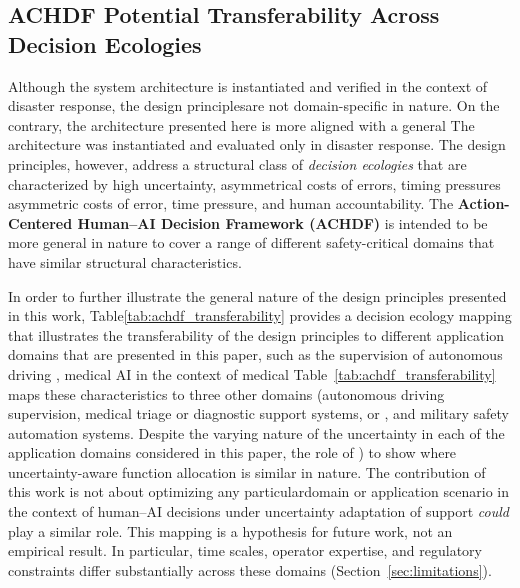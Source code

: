 \documentclass[journal]{IEEEtran}
\theoremstyle{plain}
\theoremstyle{definition}
\providecommand{\DIFaddtex}[1]{{\protect\color{blue} \sf #1}} %
\providecommand{\DIFdeltex}[1]{{\protect\color{red} \scriptsize #1}} %
\providecommand{\DIFaddbegin}{} %
\providecommand{\DIFaddend}{} %
\providecommand{\DIFdelbegin}{} %
\providecommand{\DIFdelend}{} %
\providecommand{\DIFadd}[1]{\texorpdfstring{\DIFaddtex{#1}}{#1}} %
\providecommand{\DIFdel}[1]{\texorpdfstring{\DIFdeltex{#1}}{}} %
\newcommand{\DIFscaledelfig}{0.5}
\newlength{\DIFdelgraphicswidth} %
\newlength{\DIFdelgraphicsheight} %
\newcommand{\DIFaddincludegraphics}[2][]{{\color{blue}\fbox{\DIFOincludegraphics[#1]{#2}}}} %
\newcommand{\DIFdelincludegraphics}[2][]{%
\sbox{\DIFdelgraphicsbox}{\DIFOincludegraphics[#1]{#2}}%
\settoboxwidth{\DIFdelgraphicswidth}{\DIFdelgraphicsbox} %
\settoboxtotalheight{\DIFdelgraphicsheight}{\DIFdelgraphicsbox} %
\scalebox{\DIFscaledelfig}{%
\parbox[b]{\DIFdelgraphicswidth}{\usebox{\DIFdelgraphicsbox}\\[-\baselineskip] \rule{\DIFdelgraphicswidth}{0em}}\llap{\resizebox{\DIFdelgraphicswidth}{\DIFdelgraphicsheight}{%
\setlength{\unitlength}{\DIFdelgraphicswidth}%
\begin{picture}(1,1)%
\thicklines\linethickness{2pt} %
{\color[rgb]{1,0,0}\put(0,0){\framebox(1,1){}}}%
{\color[rgb]{1,0,0}\put(0,0){\line( 1,1){1}}}%
{\color[rgb]{1,0,0}\put(0,1){\line(1,-1){1}}}%
\end{picture}%
}\hspace*{3pt}}} %
} %
\DeclareRobustCommand{\DIFaddbegin}{\DIFOaddbegin \let\includegraphics\DIFaddincludegraphics} %
\DeclareRobustCommand{\DIFaddend}{\DIFOaddend \let\includegraphics\DIFOincludegraphics} %
\DeclareRobustCommand{\DIFdelbegin}{\DIFOdelbegin \let\includegraphics\DIFdelincludegraphics} %
\DeclareRobustCommand{\DIFdelend}{\DIFOaddend \let\includegraphics\DIFOincludegraphics} %
\begin{document}
\subsection{\DIFdelbegin \DIFdel{ACHDF }\DIFdelend \DIFaddbegin \DIFadd{Potential }\DIFaddend Transferability Across Decision Ecologies}
\DIFdelbegin \DIFdel{Although the system architecture is instantiated and verified in the context of disaster response, the design principlesare not domain-specific in nature. On the contrary, the architecture presented here is more aligned with a general }\DIFdelend \DIFaddbegin \DIFadd{The architecture was instantiated and evaluated only in disaster response. The design principles, however, address a structural }\DIFaddend class of \emph{decision ecologies} \DIFdelbegin \DIFdel{that are }\DIFdelend characterized by high uncertainty, \DIFdelbegin \DIFdel{asymmetrical costs of errors, timing pressures}\DIFdelend \DIFaddbegin \DIFadd{asymmetric costs of error, time pressure}\DIFaddend , and human accountability. \DIFdelbegin \DIFdel{The \textbf{Action-Centered Human--AI Decision Framework (ACHDF)} is intended to be more general in nature to cover a range of different safety-critical domains that have similar structural characteristics.
}%

\DIFdel{In order to further illustrate the general nature of the design principles presented in this work, Table\ref{tab:achdf_transferability} provides a decision ecology mapping that illustrates the transferability of the design principles to different application domains that are presented in this paper, such as the supervision of autonomous driving , medical AI in the context of medical }\DIFdelend \DIFaddbegin \DIFadd{Table~\ref{tab:achdf_transferability} maps these characteristics to three other domains (autonomous driving supervision, medical }\DIFaddend triage or diagnostic support\DIFdelbegin \DIFdel{systems, or }\DIFdelend \DIFaddbegin \DIFadd{, and }\DIFaddend military safety automation\DIFdelbegin \DIFdel{systems. Despite the varying nature of the uncertainty in each of the application domains considered in this paper, the role of }\DIFdelend \DIFaddbegin \DIFadd{) to show where }\DIFaddend uncertainty-aware \DIFdelbegin \DIFdel{function allocation is similar in nature. The contribution of this work is not about optimizing any particulardomain or application scenario in the context of human--AI decisions under uncertainty}\DIFdelend \DIFaddbegin \DIFadd{adaptation of support \emph{could} play a similar role. This mapping is a hypothesis for future work, not an empirical result. In particular, time scales, operator expertise, and regulatory constraints differ substantially across these domains (Section~\ref{sec:limitations})}\DIFaddend .
\end{document}
